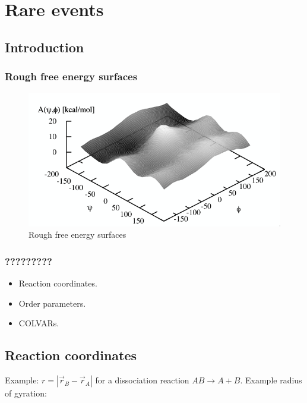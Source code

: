 \graphicspath{{chapters/19/images/}}
\chapter{Rare events}

\section{Introduction}

	\subsection{Rough free energy surfaces}

	\begin{figure}[H]
		\includegraphics[width=\textwidth]{rough-free-energy-surfaces}
		\caption{Rough free energy surfaces}
		\label{fig:rough-free-energy-surfaces}
	\end{figure}

	\subsection{?????????}

		\begin{itemize}
			\item Reaction coordinates.
			\item Order parameters.
			\item COLVARs.
		\end{itemize}

\section{Reaction coordinates}
Example: $r = |\vec{r}_B-\vec{r}_A|$ for a dissociation reaction $AB\rightarrow A+B$.
Example radius of gyration:

